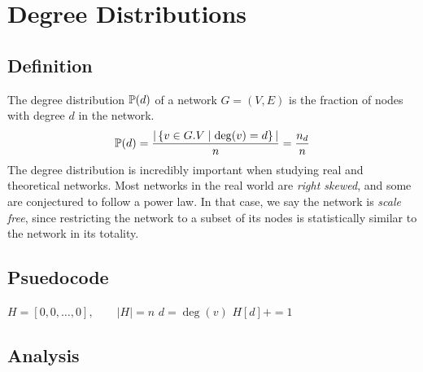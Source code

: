 \documentclass[11pt]{article}
\begin{document}
\section{Degree Distributions}

\subsection{Definition}

The degree distribution $\mathbb{P}(d)$ of a network $G = (V, E)$ is the fraction of nodes
with degree $d$ in the network.
\begin{equation*}
    \mathbb{P}(d) = \frac{|\left\{ v \in G.V \mid \deg (v) = d \right\}|}{n} =
    \frac{n_d}{n}
\end{equation*}
The degree distribution is incredibly important when studying real and theoretical
networks. Most networks in the real world are \emph{right skewed}, and some are 
conjectured to follow a power law. In that case, we say the network is \emph{scale
free}, since restricting the network to a subset of its nodes is statistically 
similar to the network in its totality. 

\subsection{Psuedocode}

\begin{algorithm}[H]
	\caption{Degree Distribution} \label{alg:dd}
	\begin{algorithmic}[1]
		\State $H = [0, 0, \dots, 0], \qquad |H| = n$
		    \State $d = \deg (v)$
		    \State $H[d] += 1$
		\EndFor
		\State {}
		\EndProcedure
	\end{algorithmic}
\end{algorithm}
\newpage
\subsection{Analysis}
\end{document}
